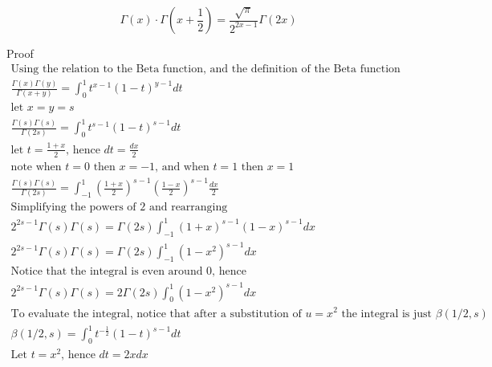 \documentclass[a4paper]{article}
\begin{document}
    \begin{theorem}
        \begin{equation}
            \boxed{
                \Gamma(x) \cdot \Gamma(x+\frac{1}{2}) = \frac{\sqrt{\pi}}{2^{2x - 1}} \Gamma(2x)
            }\label{eq:equation26}
        \end{equation}

        Proof
        \\
        \begin{gather*}
            \text{Using the relation to the Beta function, and the definition of the Beta function}
            \\
            \frac{\Gamma(x) \Gamma(y)}{\Gamma(x+y)} =
            \int_{0}^{1} t^{x-1} (1-t)^{y-1} dt
            \\
            \text{let $x=y=s$}
            \\
            \frac{\Gamma(s) \Gamma(s)}{\Gamma(2s)} =
            \int_{0}^{1} t^{s-1} (1-t)^{s-1} dt
            \\
            \text{let $t = \frac{1+x}{2}$, hence $dt = \frac{dx}{2}$}
            \\
            \text{note when $t=0$ then $x=-1$, and when $t=1$ then $x=1$}
            \\
            \frac{\Gamma(s) \Gamma(s)}{\Gamma(2s)} =
            \int_{-1}^{1} (\frac{1+x}{2})^{s-1} (\frac{1-x}{2})^{s-1} \frac{dx}{2}
            \\
            \text{Simplifying the powers of 2 and rearranging}
            \\
            2^{2s -1} \Gamma(s) \Gamma(s)= \Gamma(2s)
            \int_{-1}^{1} (1+x)^{s-1} (1-x)^{s-1} dx
            \\
            2^{2s -1} \Gamma(s) \Gamma(s)=
            \Gamma(2s) \int_{-1}^{1} (1-x^2)^{s-1} dx
            \\
            \text{Notice that the integral is even around 0, hence}
            \\
            2^{2s -1} \Gamma(s) \Gamma(s)=
            2 \Gamma(2s) \int_{0}^{1} (1-x^2)^{s-1} dx
            \\
            \text{To evaluate the integral, notice that after a substitution of $u=x^2$ the integral is just $\beta(1/2, s)$}
            \\
            \beta(1/2, s) = \int_{0}^{1} t^{-\frac{1}{2}} (1-t)^{s-1} dt
            \\
            \text{Let $t=x^2$, hence $dt = 2x dx$}
            \\

\end{gather*}
\end{theorem}
\end{document}
